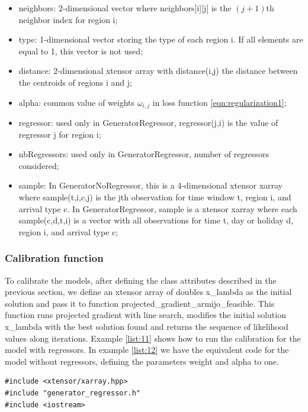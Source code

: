\documentclass[article]{jss}
\begin{document}
{\begin{itemize}
    and parameter  $\varepsilon$ in \eqref{eqn:feassetref1} when using GeneratorRegressor;
    \item neighbors: 2-dimensional vector where neighbors[i][j] is the 
    $(j+1)$th neighbor index for
    region i;
    \item type: 1-dimensional vector storing the type of each region i. If all elements are equal to 1, this vector is not used;
    \item distance: 2-dimensional xtensor array
    with distance(i,j)
  the distance between the centroids of regions i and j;
    \item alpha: common value of weights \(\omega_{i,j}\) in loss function \eqref{eqn:regularization1};
    \item regressor: used only in GeneratorRegressor,  regressor(j,i) is the value of regressor j for region i;
    \item nbRegressors: used only in GeneratorRegressor, number of regressors considered;
    \item sample: In GeneratorNoRegressor, this is a 4-dimensional xtensor xarray where sample(t,i,c,j) is the jth observation for time window t, region i, and arrival type c. In GeneratorRegressor, sample is a xtensor xarray where each sample(c,d,t,i) is a vector with all observations for time t, day or holiday d, region i, and arrival type c; 
\end{itemize}

\subsubsection{Calibration function}

To calibrate the models, after defining the class attributes described in the previous section, we define an xtensor array of doubles x\_lambda as the initial solution and pass it to function projected\_gradient\_armijo\_feasible. This function runs projected gradient with line search, modifies the initial solution x\_lambda with the best solution found and returns the sequence of likelihood values along iterations. Example \ref{list:11} shows how to run the  calibration for the model with regressors. In example \ref{list:12} we have the equivalent code for the model without regressors, defining the parameters weight and alpha to one.


\begin{lstlisting}[label={list:11},caption=Calibration of the model with regressors in \proglang{C++}]
#include <xtensor/xarray.hpp>
#include "generator_regressor.h"
#include <iostream>


\end{lstlisting}}
\end{document}
